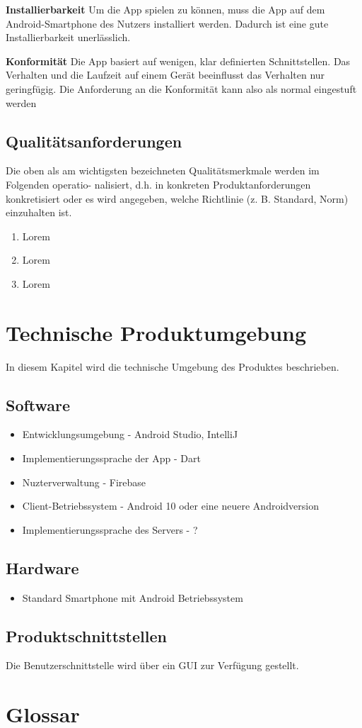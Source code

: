 \documentclass[parskip=full]{scrartcl}
\begin{document}
\textbf{Installierbarkeit}\newline
Um die App spielen zu können, muss die App auf dem Android-Smartphone des Nutzers installiert werden.
Dadurch ist eine gute Installierbarkeit unerlässlich.

\textbf{Konformität}\newline
Die App basiert auf wenigen, klar definierten Schnittstellen. Das Verhalten und die Laufzeit auf einem Gerät beeinflusst das Verhalten nur geringfügig. Die Anforderung an die Konformität kann also als normal eingestuft werden

\subsection{Qualitätsanforderungen}
Die oben als am wichtigsten bezeichneten Qualitätsmerkmale werden im Folgenden operatio- nalisiert, d.h. in konkreten Produktanforderungen konkretisiert oder es wird angegeben, welche Richtlinie (z. B. Standard, Norm) einzuhalten ist.

\begin{enumerate}[start=1,label={$\langle$\bfseries Q\arabic*$\rangle$}, leftmargin = 5em, itemsep=4pt, parsep=4pt]
    \item Lorem
    \item Lorem
    \item Lorem
\end{enumerate}

\section{Technische Produktumgebung}
In diesem Kapitel wird die technische Umgebung des Produktes beschrieben.

\subsection{Software}
\begin{itemize}
    \item Entwicklungsumgebung - Android Studio, IntelliJ
    \item Implementierungssprache der App - Dart
    \item Nuzterverwaltung - Firebase
    \item Client-Betriebssystem - Android 10 oder eine neuere Androidversion
    \item Implementierungssprache des Servers - ?
\end{itemize}

\subsection{Hardware}
\begin{itemize}
    \item Standard Smartphone mit Android Betriebssystem
\end{itemize}

\subsection{Produktschnittstellen}
Die Benutzerschnittstelle wird über ein GUI zur Verfügung gestellt.

\section{Glossar}
\end{document}
